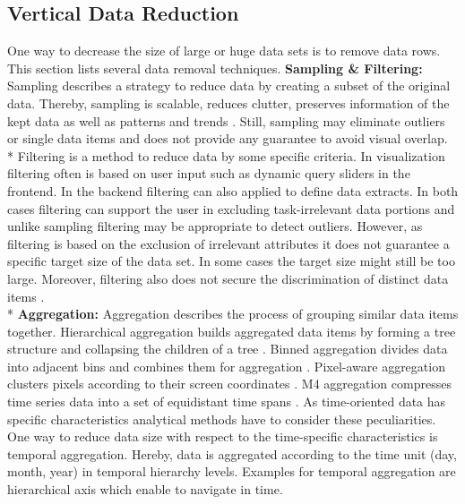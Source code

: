 \subsection{Vertical Data Reduction}
One way to decrease the size of large or huge data sets is to remove data rows. This section lists several data removal techniques. 
\textbf{Sampling \& Filtering: }\label{sampling}\label{filtering}
Sampling describes a strategy to reduce data by creating a subset of the original data. Thereby, sampling is scalable, reduces clutter, preserves information of the kept data as well as patterns and trends \cite{PiringerHarald2011}. Still, sampling may eliminate outliers or single data items and does not provide any guarantee to avoid visual overlap. \\*
Filtering is a method to reduce data by some specific criteria. In visualization filtering often is based on user input such as dynamic query sliders in the frontend. In the backend filtering can also applied to define data extracts. In both cases filtering can support the user in excluding task-irrelevant data portions and unlike sampling filtering may be appropriate to detect outliers. However, as filtering is based on the exclusion of irrelevant attributes it does not guarantee a specific target size of the data set. In some cases the target size might still be too large. Moreover, filtering also does not secure the discrimination of distinct data items  \cite{PiringerHarald2011}.\\*
\textbf{Aggregation: }\label{aggregation}
Aggregation describes the process of grouping similar data items together. Hierarchical aggregation builds aggregated data items by forming a tree structure and collapsing the children of a tree  \cite{Elmqvist2010}. Binned aggregation divides data into adjacent bins and combines them for aggregation  \cite{Liu2013}. Pixel-aware aggregation clusters pixels according to their screen coordinates  \cite{Li2016}. M4 aggregation compresses time series data into a set of equidistant time spans  \cite{Jugel2014}.
As time-oriented data has specific characteristics analytical methods have to consider these peculiarities. One way to reduce data size with respect to the time-specific characteristics is temporal aggregation. Hereby, data is aggregated according to the time unit (day, month, year) in temporal hierarchy levels. Examples for temporal aggregation are hierarchical axis  \cite{Chung2014} which enable to navigate in time. 

